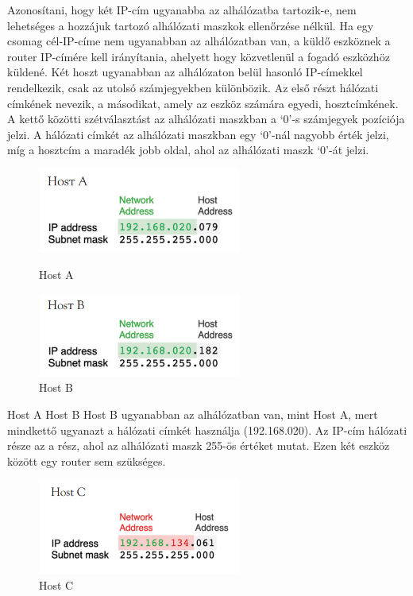 Azonosítani, hogy két IP-cím ugyanabba az alhálózatba tartozik-e, nem lehetséges 
a hozzájuk tartozó alhálózati maszkok ellenőrzése nélkül.
Ha egy csomag cél-IP-címe nem ugyanabban az alhálózatban van,
a küldő eszköznek a router IP-címére kell irányítania, ahelyett hogy
közvetlenül a fogadó eszközhöz küldené. 
Két hoszt ugyanabban az alhálózaton belül hasonló IP-címekkel rendelkezik, csak az utolsó számjegyekben
különbözik. Az első részt hálózati címkének nevezik, a másodikat, amely az
eszköz számára egyedi, hosztcímkének. A kettő közötti szétválasztást az
alhálózati maszkban a `0'-s számjegyek pozíciója jelzi.
A hálózati címkét az alhálózati maszkban egy `0'-nál nagyobb érték jelzi,
míg a hosztcím a maradék jobb oldal, ahol az alhálózati maszk `0'-át jelzi.
\begin{figure}[H]
    \centering
    \begin{minipage}{0.45\textwidth}
        \centering
        \includegraphics[width=67mm, keepaspectratio]{figures/host_a.png}
        \caption{Host A}
    \end{minipage}\hfill
    \begin{minipage}{0.45\textwidth}
        \centering
        \includegraphics[width=67mm, keepaspectratio]{figures/host_b.png}
        \caption{Host B}
    \end{minipage}
\end{figure}
Host A Host B  Host B ugyanabban az alhálózatban van,
mint Host A, mert mindkettő ugyanazt a hálózati címkét használja (192.168.020).
Az IP-cím hálózati része az a rész, ahol az alhálózati maszk 255-ös értéket
mutat. Ezen két eszköz között egy router sem szükséges. 
\begin{figure}[H]
	\centering
	\includegraphics[width=67mm, keepaspectratio]{figures/host_c.png}
	\caption{Host C}
	\label {fig:host_c}
\end{figure}
